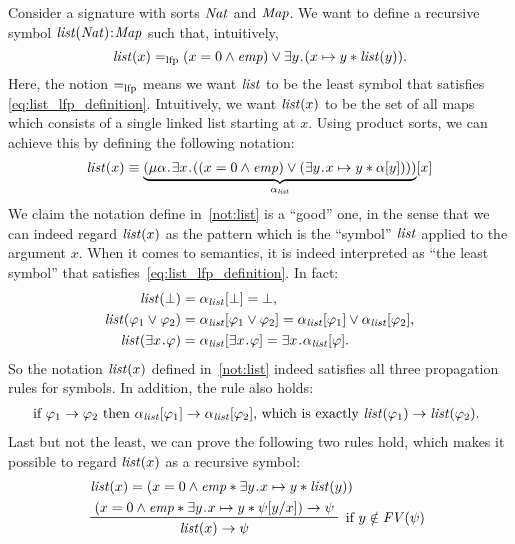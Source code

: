 \documentclass{amsart}
\begin{document}
Consider a signature with sorts $\mathit{Nat}$ and $\mathit{Map}$.
We want to define a recursive symbol $\mathit{list}(\mathit{Nat})\mathbin{\!:\!} \mathit{Map}$
such that, intuitively,
\begin{equation}
\label{eq:list_lfp_definition}
\mathit{list}(x) =_{\mathrm{lfp}} (x = 0 \wedge \mathit{emp}) \vee \exists y \mathbin{\!.\!} 
(x \mapsto y \mathbin{*} \mathit{list}(y)).
\end{equation}
Here, the notion $=_{\mathrm{lfp}}$ means we want $\mathit{list}$ to be the least symbol
that satisfies \eqref{eq:list_lfp_definition}.
Intuitively, we want $\mathit{list}(x)$ to be the set of
all maps which consists of a single linked list starting at $x$.
Using product sorts, we can achieve this by defining
the following notation:
\begin{equation}
\label{not:list}
\mathit{list}(x) \equiv 
\underbrace{( \mu \alpha \mathbin{\!.\!} \exists x \mathbin{\!.\!} 
( (x = 0 \wedge \mathit{emp}) \vee (\exists y \mathbin{\!.\!} x \mapsto y \mathbin{*} \alpha[y] )))
}_{\alpha_{\mathit{list}}}
[x]
\end{equation}
We claim the notation define in~\eqref{not:list} is a ``good'' one,
in the sense that we can indeed regard 
$\mathit{list}(x)$ as the pattern which is the ``symbol'' $\mathit{list}$ applied
to the argument $x$.
When it comes to semantics, it is indeed interpreted as ``the least symbol''
that satisfies~\eqref{eq:list_lfp_definition}.
In fact:
\begin{align}
\mathit{list}(\bot) &= \alpha_{\mathit{list}}[\bot] = \bot,
\\
\mathit{list}(\varphi_1 \vee \varphi_2) &= \alpha_{\mathit{list}}[\varphi_1 \vee \varphi_2]
= \alpha_{\mathit{list}}[\varphi_1] \vee \alpha_{\mathit{list}}[\varphi_2],
\\
\mathit{list}(\exists x \mathbin{\!.\!} \varphi) &=
\alpha_{\mathit{list}}[\exists x \mathbin{\!.\!} \varphi] =
\exists x \mathbin{\!.\!} \alpha_{\mathit{list}}[\varphi].
\end{align}
So the notation $\mathit{list}(x)$ defined in~\eqref{not:list}
indeed satisfies all three propagation rules for symbols.
In addition, the  rule also holds:
\begin{align}
\text{if $\varphi_1 \to \varphi_2$ then
$\alpha_{\mathit{list}}[\varphi_1] \to \alpha_{\mathit{list}}[\varphi_2]$,
which is exactly
$\mathit{list}(\varphi_1) \to \mathit{list}(\varphi_2)$.
}
\end{align}
Last but not the least, we can prove the following two rules hold,
which makes it possible to regard $\mathit{list}(x)$ as a recursive symbol:
\begin{align}
&\listit(x) = (x = 0 \wedge \emp \merge \exists y \ldot x \mapsto y \merge 
\listit(y)) \\
&\prftree[r]
{ %
if $y \notin \FV(\psi)$
}
{
(x = 0 \wedge \emp \merge \exists y \ldot x \mapsto y \merge \psi[y/x]) 
\to \psi
}{
\listit(x) \to \psi
}
\end{align}
\end{document}
